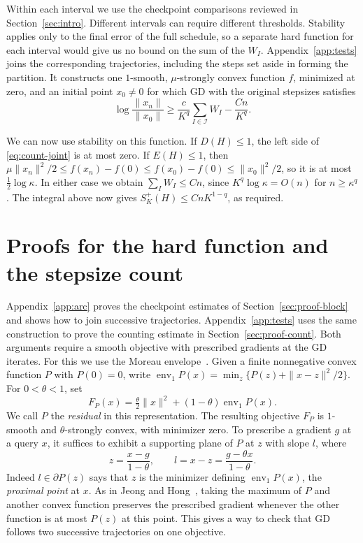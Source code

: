 \documentclass[11pt]{article}
\theoremstyle{definition}
\begin{document}
Within each interval we use the checkpoint comparisons reviewed in
Section~\ref{sec:intro}. Different intervals can require different
thresholds. Stability applies only to the final error of the full
schedule, so a separate hard function for each interval would give us
no bound on the sum of the \(W_I\). Appendix~\ref{app:tests} joins the
corresponding trajectories, including the steps set aside in forming the
partition. It constructs one \(1\)-smooth, \(\mu\)-strongly convex
function \(f\), minimized at zero, and an initial point \(x_0\ne0\) for
which GD with the original stepsizes satisfies
\begin{equation}\label{eq:count-joint}
 \log\frac{\|x_n\|}{\|x_0\|}
 \ge \frac{c}{K^q}\sum_{I\in\mathcal I}W_I-\frac{Cn}{K^q}.
\end{equation}

We can now use stability on this function. If \(D(H)\le1\), the left
side of \eqref{eq:count-joint} is at most zero. If \(E(H)\le1\), then
\(\mu\|x_n\|^2/2\le f(x_n)-f(0)\le f(x_0)-f(0)\le\|x_0\|^2/2\),
so it is at most \(\tfrac12\log\kappa\). In either case we obtain
\(\sum_I W_I\le Cn\), since \(K^q\log\kappa=O(n)\) for \(n\ge\kappa^q\).
The integral above now gives \(S_K^+(H)\le CnK^{1-q}\), as required.

\appendix
\section{Proofs for the hard function and the stepsize count}\label{app:geometry}
Appendix~\ref{app:arc} proves the checkpoint estimates of Section~\ref{sec:proof-block} and shows how to join successive trajectories. Appendix~\ref{app:tests} uses the same construction to prove the counting estimate in Section~\ref{sec:proof-count}. Both arguments require a smooth objective with prescribed gradients at the GD iterates. For this we use the Moreau envelope~\cite{Moreau}. Given a finite nonnegative convex function $P$ with $P(0)=0$, write $\operatorname{env}_1P(x)=\min_z\{P(z)+\|x-z\|^2/2\}$. For $0<\theta<1$, set
\[
 F_P(x)=\tfrac{\theta}{2}\|x\|^2+(1-\theta)\operatorname{env}_1P(x).
\]
We call $P$ the \emph{residual} in this representation. The resulting objective $F_P$ is $1$-smooth and $\theta$-strongly convex, with minimizer zero. To prescribe a gradient $g$ at a query $x$, it suffices to exhibit a supporting plane of $P$ at $z$ with slope $l$, where
\begin{equation}\label{eq:prox-interface}
 z=\frac{x-g}{1-\theta},\qquad l=x-z=\frac{g-\theta x}{1-\theta}.
\end{equation}
Indeed $l\in\partial P(z)$ says that $z$ is the minimizer defining $\operatorname{env}_1P(x)$, the \emph{proximal point} at $x$. As in Jeong and Hong~\cite[Lemma~4.1]{JH}, taking the maximum of $P$ and another convex function preserves the prescribed gradient whenever the other function is at most $P(z)$ at this point. This gives a way to check that GD follows two successive trajectories on one objective.
\end{document}
